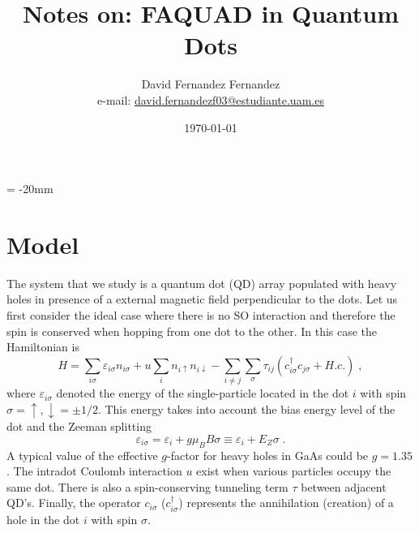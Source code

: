 \documentclass[a4paper,11pt]{article}
\begin{document}
   \droptitle = -20mm
   \title{Notes on: FAQUAD in Quantum Dots}

   \author{David Fernandez Fernandez \\ e-mail: \href{mailto:david.fernandezf03@estudiante.uam.es}{david.fernandezf03@estudiante.uam.es}}
   
   \date{\today}

   \maketitle
   
   \tableofcontents
    

\section{Model}

The system that we study is a quantum dot (QD) array populated with heavy holes in presence of a external magnetic field perpendicular to the dots. Let us first consider the ideal case where there is no SO interaction and therefore the spin is conserved when hopping from one dot to the other. In this case the Hamiltonian is
\begin{equation}
H=\sum_{i\sigma}\varepsilon_{i\sigma}n_{i\sigma}+u\sum_in_{i\uparrow}n_{i\downarrow}-\sum_{i\neq j}\sum_\sigma\tau_{ij}\left(c_{i\sigma}^\dagger c_{j\sigma}+H.c.\right)\; ,
\label{eq:Hubbard_model}
\end{equation}
where $\varepsilon_{i\sigma}$ denoted the energy of the single-particle located in the dot $i$ with spin $\sigma=\uparrow,\downarrow=\pm1/2$. This energy takes into account the bias energy level of the dot and the Zeeman splitting
\begin{equation}
\varepsilon_{i\sigma}=\varepsilon_i+g\mu_B B\sigma\equiv \varepsilon_i+E_Z\sigma\; .
\end{equation}
A typical value of the effective $g$-factor for heavy holes in GaAs could be $g=1.35$. The intradot Coulomb interaction $u$ exist when various particles occupy the same dot. There is also a spin-conserving tunneling term $\tau$ between adjacent QD's. Finally, the operator $c_{i\sigma}$ ($c_{i\sigma}^{\dagger}$) represents the annihilation (creation) of a hole in the dot $i$ with spin $\sigma$.
\end{document}
